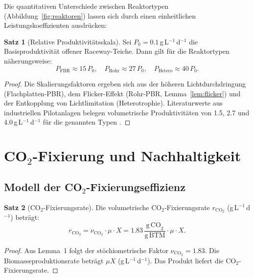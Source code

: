 ﻿\documentclass[a4paper,12pt]{article}
\theoremstyle{definition}
\newtheorem{satz}{Satz}
\begin{document}
Die quantitativen Unterschiede zwischen Reaktortypen (Abbildung~\ref{fig:reaktoren})
lassen sich durch einen einheitlichen Leistungskoeffizienten ausdrücken:

\begin{satz}[Relative Produktivitätsskala]
	Sei $P_0 = 0.1$\,g\,L$^{-1}$\,d$^{-1}$ die Basisproduktivität offener
	Raceway-Teiche. Dann gilt für die Reaktortypen näherungsweise:
	\[
		P_\mathrm{FBR} \approx 15\,P_0, \quad
		P_\mathrm{Rohr} \approx 27\,P_0, \quad
		P_\mathrm{Hetero} \approx 40\,P_0.
	\]
\end{satz}

\begin{proof}
	Die Skalierungsfaktoren ergeben sich aus der höheren Lichtdurchdringung
	(Flachplatten-PBR), dem Flicker-Effekt (Rohr-PBR, Lemma~\ref{lem:flicker})
	und der Entkopplung von Lichtlimitation (Heterotrophie). Literaturwerte
	aus industriellen Pilotanlagen belegen volumetrische Produktivitäten von
	1.5, 2.7 und 4.0\,g\,L$^{-1}$\,d$^{-1}$ für die genannten Typen
	\cite{chisti2007,slegers2011,posten2009}. \qedhere
\end{proof}

\section{CO$_2$-Fixierung und Nachhaltigkeit}

\subsection{Modell der CO$_2$-Fixierungseffizienz}

\begin{satz}[$\mathrm{CO}_2$-Fixierungsrate]
	Die volumetrische CO$_2$-Fixierungsrate $r_{\mathrm{CO}_2}$
	(g\,L$^{-1}$\,d$^{-1}$) beträgt:
	\[
		r_{\mathrm{CO}_2} = \nu_{\mathrm{CO}_2} \cdot \mu \cdot X
		= 1.83\,\frac{\mathrm{g\,CO}_2}{\mathrm{g\,BTM}} \cdot \mu \cdot X.
	\]
	\label{satz:co2fix}
\end{satz}

\begin{proof}
	Aus Lemma~1 folgt der stöchiometrische Faktor $\nu_{\mathrm{CO}_2} = 1.83$.
	Die Biomasseproduktionsrate beträgt $\mu X$ (g\,L$^{-1}$\,d$^{-1}$).
	Das Produkt liefert die CO$_2$-Fixierungsrate. \qedhere
\end{proof}
\end{document}

